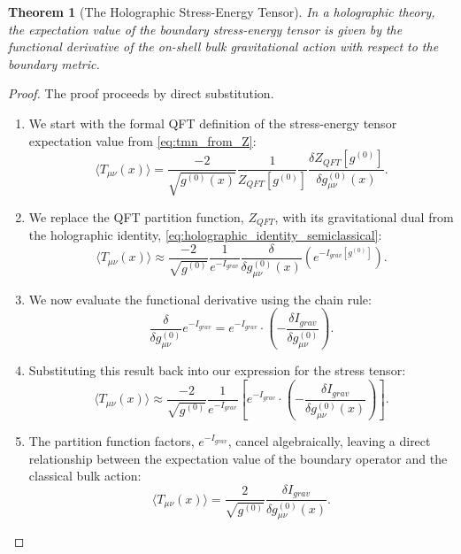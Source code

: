 \documentclass[11pt, letterpaper]{report}
\theoremstyle{plain} %
\newtheorem{theorem}{Theorem}[chapter]
\theoremstyle{definition} %
\theoremstyle{remark} %
\begin{document}
\begin{theorem}[The Holographic Stress-Energy Tensor]
\label{thm:holographic_stress_tensor}
In a holographic theory, the expectation value of the boundary stress-energy tensor is given by the functional derivative of the on-shell bulk gravitational action with respect to the boundary metric.
\end{theorem}
\begin{proof}
The proof proceeds by direct substitution.
\begin{enumerate}
    \item We start with the formal QFT definition of the stress-energy tensor expectation value from \cref{eq:tmn_from_Z}:
    $$
    \langle T_{\mu\nu}(x) \rangle = \frac{-2}{\sqrt{g^{(0)}(x)}} \frac{1}{Z_{QFT}[g^{(0)}]} \frac{\delta Z_{QFT}[g^{(0)}]}{\delta g^{(0)}_{\mu\nu}(x)}.
    $$
    \item We replace the QFT partition function, $Z_{QFT}$, with its gravitational dual from the holographic identity, \cref{eq:holographic_identity_semiclassical}:
    \begin{equation}
        \langle T_{\mu\nu}(x) \rangle \approx \frac{-2}{\sqrt{g^{(0)}}} \frac{1}{e^{-I_{grav}}} \frac{\delta }{\delta g^{(0)}_{\mu\nu}(x)} \left( e^{-I_{grav}[g^{(0)}]} \right).
    \end{equation}
    \item We now evaluate the functional derivative using the chain rule:
    \begin{equation}
        \frac{\delta}{\delta g^{(0)}_{\mu\nu}} e^{-I_{grav}} = e^{-I_{grav}} \cdot \left( -\frac{\delta I_{grav}}{\delta g^{(0)}_{\mu\nu}} \right).
    \end{equation}
    \item Substituting this result back into our expression for the stress tensor:
    \begin{equation}
        \langle T_{\mu\nu}(x) \rangle \approx \frac{-2}{\sqrt{g^{(0)}}} \frac{1}{e^{-I_{grav}}} \left[ e^{-I_{grav}} \cdot \left( -\frac{\delta I_{grav}}{\delta g^{(0)}_{\mu\nu}(x)} \right) \right].
    \end{equation}
    \item The partition function factors, $e^{-I_{grav}}$, cancel algebraically, leaving a direct relationship between the expectation value of the boundary operator and the classical bulk action:
    \begin{equation}
        \langle T_{\mu\nu}(x) \rangle = \frac{2}{\sqrt{g^{(0)}}} \frac{\delta I_{grav}}{\delta g^{(0)}_{\mu\nu}(x)}.

\end{equation}
\end{enumerate}
\end{proof}
\end{document}

